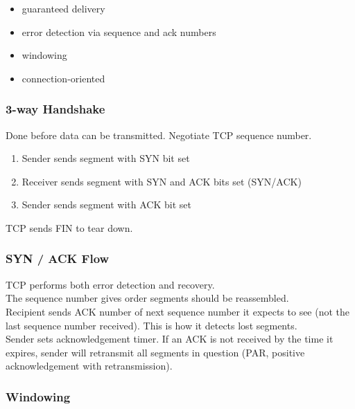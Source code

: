 \begin{itemize}

\item guaranteed delivery
\item error detection via sequence and ack numbers
\item windowing
\item connection-oriented

\end{itemize}

\subsubsection{3-way Handshake}

Done before data can be transmitted. Negotiate TCP sequence number.

\begin{enumerate}

\item Sender sends segment with SYN bit set
\item Receiver sends segment with SYN and ACK bits set (SYN/ACK)
\item Sender sends segment with ACK bit set

\end{enumerate}

TCP sends FIN to tear down.

\subsubsection{SYN / ACK Flow}

TCP performs both error detection and recovery.\\

The sequence number gives order segments should be reassembled.\\

Recipient sends ACK number of next sequence number it expects to see (not the
last sequence number received). This is how it detects lost segments.\\

Sender sets acknowledgement timer. If an ACK is not received by the time
it expires, sender will retransmit all segments in question (PAR,
positive acknowledgement with retransmission).

\subsubsection{Windowing}


